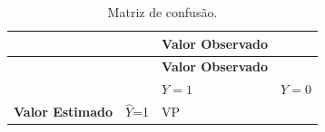\documentclass[12pt,brazil,oneside]{book}
\begin{document}
\begin{longtable}[]{@{}llll@{}}
\caption{\label{tab:matriz}Matriz de confusão.}\tabularnewline
\toprule
\begin{minipage}[b]{0.25\columnwidth}\raggedright
\strut
\end{minipage} & \begin{minipage}[b]{0.15\columnwidth}\raggedright
\strut
\end{minipage} & \begin{minipage}[b]{0.25\columnwidth}\raggedright
\textbf{Valor Observado}\strut
\end{minipage} & \begin{minipage}[b]{0.12\columnwidth}\raggedright
\strut
\end{minipage}\tabularnewline
\midrule
\endfirsthead
\toprule
\begin{minipage}[b]{0.25\columnwidth}\raggedright
\strut
\end{minipage} & \begin{minipage}[b]{0.15\columnwidth}\raggedright
\strut
\end{minipage} & \begin{minipage}[b]{0.25\columnwidth}\raggedright
\textbf{Valor Observado}\strut
\end{minipage} & \begin{minipage}[b]{0.12\columnwidth}\raggedright
\strut
\end{minipage}\tabularnewline
\midrule
\endhead
\begin{minipage}[t]{0.25\columnwidth}\raggedright
\strut
\end{minipage} & \begin{minipage}[t]{0.15\columnwidth}\raggedright
\strut
\end{minipage} & \begin{minipage}[t]{0.25\columnwidth}\raggedright
\(Y=1\)\strut
\end{minipage} & \begin{minipage}[t]{0.12\columnwidth}\raggedright
\(Y=0\)\strut
\end{minipage}\tabularnewline
\begin{minipage}[t]{0.25\columnwidth}\raggedright
\textbf{Valor Estimado}\strut
\end{minipage} & \begin{minipage}[t]{0.15\columnwidth}\raggedright
\(\hat Y\)=1\strut
\end{minipage} & \begin{minipage}[t]{0.25\columnwidth}\raggedright
VP\strut
\end{minipage} & \begin{minipage}[t]{0.12\columnwidth}\raggedright

\end{minipage}
\end{longtable}
\end{document}
